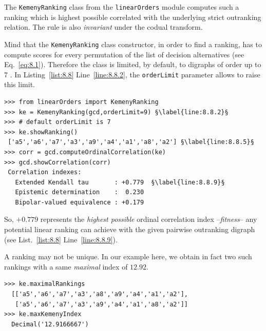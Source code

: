 The \texttt{KemenyRanking} class from the \texttt{linearOrders} module computes such a ranking which is highest possible correlated with the underlying strict outranking relation. The \Kemeny rule is also \emph{invariant} under the codual transform.

Mind that the \texttt{KemenyRanking} class constructor, in order to find a \Kemeny ranking, has to compute \NetFlows scores for every permutation of the list of decision alternatives (see Eq.~\vref{eq:8.1}). Therefore the class is limited, by default, to digraphs of order up to 7 \citep{BIS-2021b}. In Listing~\vref{list:8.8} Line~\ref{line:8.8.2}, the \texttt{orderLimit} parameter allows to raise this limit.
\begin{lstlisting}[caption={Computing a \Kemeny ranking},label=list:8.8]   
>>> from linearOrders import KemenyRanking
>>> ke = KemenyRanking(gcd,orderLimit=9) §\label{line:8.8.2}§
>>> # default orderLimit is 7
>>> ke.showRanking()
 ['a5','a6','a7','a3','a9','a4','a1','a8','a2'] §\label{line:8.8.5}§
>>> corr = gcd.computeOrdinalCorrelation(ke)
>>> gcd.showCorrelation(corr)
 Correlation indexes:
   Extended Kendall tau       : +0.779  §\label{line:8.8.9}§
   Epistemic determination    :  0.230
   Bipolar-valued equivalence : +0.179
\end{lstlisting}    

So, $+0.779$ represents the \emph{highest possible} ordinal correlation index --\emph{fitness}-- any potential linear ranking can achieve with the given pairwise outranking digraph (see List.~\vref{list:8.8} Line~\ref{line:8.8.9}).

A \Kemeny ranking may not be unique. In our example here, we obtain in fact two such \Kemeny rankings with a same \emph{maximal} \Kemeny index of $12.92$. 
\begin{lstlisting}[caption={Optimal \Kemeny rankings},label=list:8.9]
>>> ke.maximalRankings
  [['a5','a6','a7','a3','a8','a9','a4','a1','a2'],
   ['a5','a6','a7','a3','a9','a4','a1','a8','a2']]
>>> ke.maxKemenyIndex
  Decimal('12.9166667')
\end{lstlisting}


